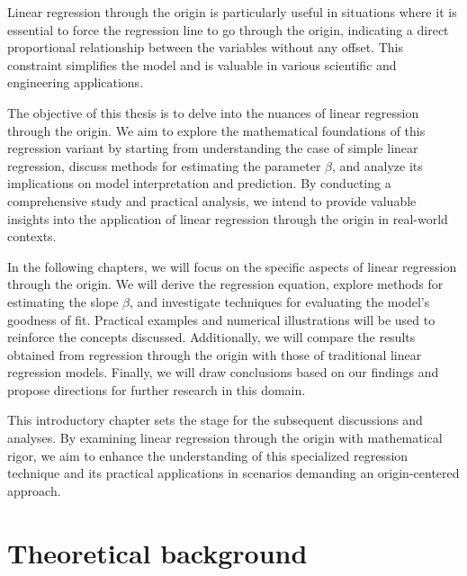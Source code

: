 \documentclass[12pt,a4paper,oneside]{book} %
\begin{document}
Linear regression through the origin is particularly useful in situations where it is essential to force the regression line to go through the origin, indicating a direct proportional relationship between the variables without any offset. This constraint simplifies the model and is valuable in various scientific and engineering applications.

The objective of this thesis is to delve into the nuances of linear regression through the origin. We aim to explore the mathematical foundations of this regression variant by starting from understanding the case of simple linear regression, discuss methods for estimating the parameter \(\beta\), and analyze its implications on model interpretation and prediction. By conducting a comprehensive study and practical analysis, we intend to provide valuable insights into the application of linear regression through the origin in real-world contexts.

In the following chapters, we will focus on the specific aspects of linear regression through the origin. We will derive the regression equation, explore methods for estimating the slope \(\beta\), and investigate techniques for evaluating the model's goodness of fit. Practical examples and numerical illustrations will be used to reinforce the concepts discussed. Additionally, we will compare the results obtained from regression through the origin with those of traditional linear regression models. Finally, we will draw conclusions based on our findings and propose directions for further research in this domain.

This introductory chapter sets the stage for the subsequent discussions and analyses. By examining linear regression through the origin with mathematical rigor, we aim to enhance the understanding of this specialized regression technique and its practical applications in scenarios demanding an origin-centered approach.


	
	

	\chapter{Theoretical background} %
\end{document}
